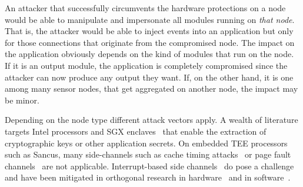 An attacker that successfully circumvents the hardware protections on a node
would be able to manipulate and impersonate all modules running on \emph{that
node}.  That is, the attacker would be able to inject events into an application
but only for those connections that originate from the compromised node.  The
impact on the application obviously depends on the kind of modules that run on
the node.  If it is an output module, the application is completely compromised
since the attacker can now produce any output they want.  If, on the other hand,
it is one among many sensor nodes, that get aggregated on another node, the
impact may be minor.

Depending on the node type different attack vectors apply. A wealth of
literature targets Intel processors and SGX enclaves~\cite{brasser2017software,
gotzfried2017cache, weisse2018foreshadow, van2018foreshadow, van2020sgaxe} that
enable the extraction of cryptographic keys or other application secrets. On
embedded \ac{TEE} processors such as Sancus, many side-channels such as cache
timing attacks~\cite{cache-side-channels-practical,
practical-timing-side-channel-aslr} or page fault
channels~\cite{controlled-channel-attacks} are not applicable. Interrupt-based
side channels~\cite{van2018nemesis} do pose a challenge and have been mitigated
in orthogonal research in hardware~\cite{busi_2021securing} and in
software~\cite{winderix_2021_nemesis_def}.

